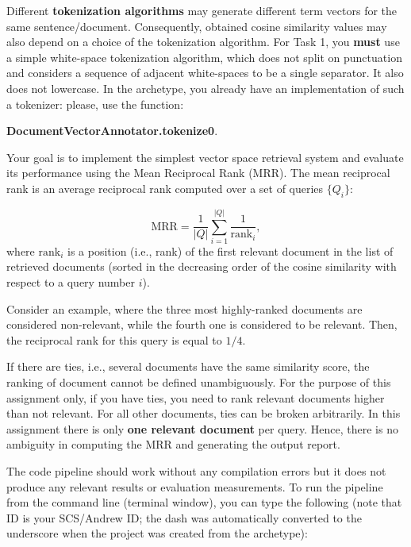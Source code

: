 \documentclass[oneside,11pt]{memoir}
\begin{document}
Different \textbf{tokenization algorithms} may generate different term vectors for the same sentence/document.
Consequently, 
obtained cosine similarity values may also depend on a choice of the tokenization algorithm.
For Task 1, you \textbf{must} use a simple white-space tokenization algorithm,
which does not split on punctuation and considers a sequence of 
adjacent white-spaces to be a single separator.
It also  does not lowercase.
In the archetype, you already have an implementation of such a tokenizer:
please, use the function:
\begin{center}
\textbf{DocumentVectorAnnotator.tokenize0}.
\end{center}

Your goal is to implement the simplest vector space retrieval system
and evaluate its performance using the Mean Reciprocal Rank (MRR).  
The mean reciprocal rank is an average reciprocal rank
computed over a set of queries $\{Q_i\}$:

\begin{equation}\label{EqMRR}
\mbox{MRR} = \frac{1}{|Q|}\sum\limits_{i=1}^{|Q|} \frac{1} {\mbox{rank}_i},
\end{equation}
where $\mbox{rank}_i$ is a position (i.e., rank) of the first relevant document
in the list of retrieved documents (sorted in the decreasing order of the cosine similarity with respect to a query number $i$).

Consider an example, where the three most highly-ranked documents are considered 
non-relevant, while the fourth one is considered to be relevant. 
Then, the reciprocal rank for this query is equal to $1/4$.

If there are ties, i.e., several documents have the same
similarity score,
the ranking of document cannot be defined unambiguously.
For the purpose of this assignment only, if you have ties,
you need to rank relevant documents higher than not relevant. 
For all other documents, ties can be broken arbitrarily.
In this assignment there is only \textbf{one relevant document} per query.
Hence, there is no ambiguity in computing the MRR and generating the output report.


The code pipeline should work without any compilation errors but it does not produce any relevant results or evaluation measurements.
To run the pipeline from the command line (terminal window), you can type the following
(note that ID is your SCS/Andrew ID; the dash was automatically converted to the underscore when the project was created from the archetype):
\end{document}
